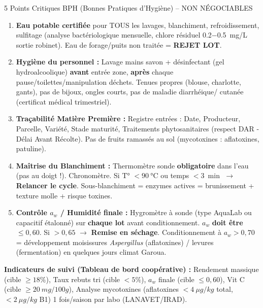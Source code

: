 \documentclass[11pt]{article}
\begin{document}
\begin{exoresolu}
\begin{attention}{5 Points Critiques BPH (Bonnes Pratiques d'Hygiène) -- NON NÉGOCIABLES}
\begin{enumerate}
    \item \textbf{Eau potable certifiée} pour TOUS les lavages, blanchiment, refroidissement, sulfitage (analyse bactériologique mensuelle, chlore résiduel \SI{0,2-0,5}{mg/L} sortie robinet). Eau de forage/puits non traitée = \textbf{REJET LOT}.
    \item \textbf{Hygiène du personnel :} Lavage mains savon + désinfectant (gel hydroalcoolique) \textbf{avant} entrée zone, \textbf{après} chaque pause/toilettes/manipulation déchets. Tenues propres (blouse, charlotte, gants), pas de bijoux, ongles courts, pas de maladie diarrhéique/ cutanée (certificat médical trimestriel).
    \item \textbf{Traçabilité Matière Première :} Registre entrées : Date, Producteur, Parcelle, Variété, Stade maturité, Traitements phytosanitaires (respect DAR - Délai Avant Récolte). Pas de fruits ramassés au sol (mycotoxines : aflatoxines, patuline).
    \item \textbf{Maîtrise du Blanchiment :} Thermomètre sonde \textbf{obligatoire} dans l'eau (pas au doigt !). Chronomètre. Si T° $< \SI{90}{\celsius}$ ou temps $< \SI{3}{\min}$ $\rightarrow$ \textbf{Relancer le cycle}. Sous-blanchiment = enzymes actives = brunissement + texture molle + risque toxines.
    \item \textbf{Contrôle $a_w$ / Humidité finale :} Hygromètre à sonde (type AquaLab ou capacitif étalonné) sur \textbf{chaque lot} avant conditionnement. $a_w$ \textbf{doit être} $\le 0,60$. Si $> 0,65$ $\rightarrow$ \textbf{Remise en séchage}. Conditionnement à $a_w > 0,70$ = développement moisissures \emph{Aspergillus} (aflatoxines) / levures (fermentation) en quelques jours climat Garoua.
\end{enumerate}
\end{attention}

\textbf{Indicateurs de suivi (Tableau de bord coopérative) :} Rendement massique (cible $\ge 18\%$), Taux rebuts tri (cible $< 5\%$), $a_w$ finale (cible $\le 0,60$), Vit C (cible $\ge \SI{20}{mg/100g}$), Analyse mycotoxines (aflatoxines $< \SI{4}{\mu g/kg}$ total, $< \SI{2}{\mu g/kg}$ B1) 1 fois/saison par labo (LANAVET/IRAD).
\end{exoresolu}
\end{document}
